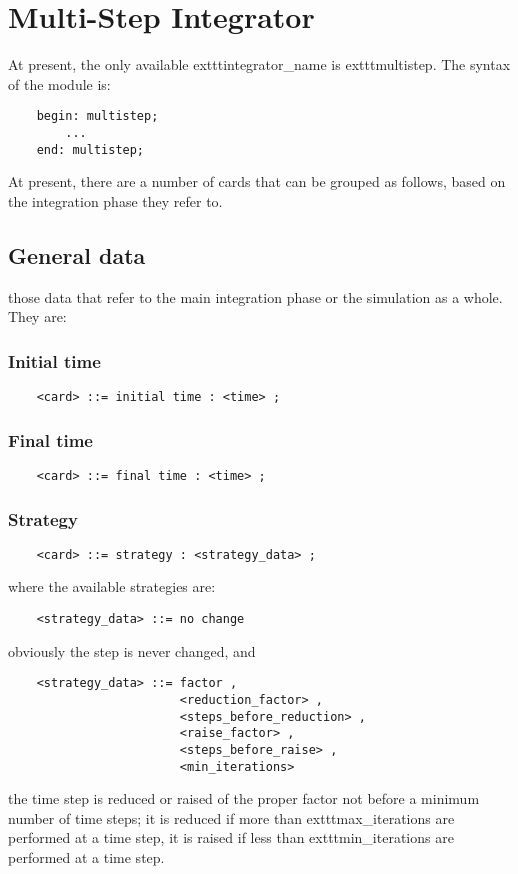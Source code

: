\section{Multi-Step Integrator}
At present, the only available 	exttt{integrator\_name} is 	exttt{multistep}.
The syntax of the module is:
\begin{verbatim}
    begin: multistep;
        ...
    end: multistep;
\end{verbatim}
At present, there are a number of cards that can be grouped as follows, 
based on the integration phase they refer to.

\subsection{General data}
those data that refer to the main integration phase or the simulation as a
whole. They are:

\subsubsection{Initial time}
\begin{verbatim}
    <card> ::= initial time : <time> ;
\end{verbatim}

\subsubsection{Final time}
\begin{verbatim}
    <card> ::= final time : <time> ;
\end{verbatim}

\subsubsection{Strategy}
\begin{verbatim}
    <card> ::= strategy : <strategy_data> ;
\end{verbatim}
where the available strategies are:
\begin{verbatim}
    <strategy_data> ::= no change 
\end{verbatim}
obviously the step is never changed, and
\begin{verbatim}
    <strategy_data> ::= factor , 
                        <reduction_factor> ,
                        <steps_before_reduction> ,
                        <raise_factor> ,
                        <steps_before_raise> ,
                        <min_iterations>
\end{verbatim}
the time step is reduced or raised of the proper factor not before a
minimum number of time steps; it is reduced if more than 
	exttt{max\_iterations} are performed at a time step, it is raised if less
than 	exttt{min\_iterations} are performed at a time step.

